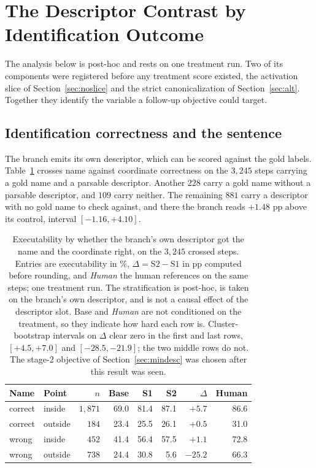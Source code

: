 \documentclass[conference]{IEEEtran}
\begin{document}
\section{The Descriptor Contrast by Identification Outcome}
\label{sec:diag}

The analysis below is post-hoc and rests on one treatment run. Two of its components were
registered before any treatment score existed, the activation slice of
Section~\ref{sec:noslice} and the strict canonicalization of Section~\ref{sec:alt}. Together
they identify the variable a follow-up objective could target.

\subsection{Identification correctness and the sentence}
The branch emits its own descriptor, which can be scored against the gold labels.
Table~\ref{tab:cross} crosses name against coordinate correctness on the $3{,}245$ steps carrying a gold name and a parsable descriptor. Another $228$ carry a gold name
without a parsable descriptor, and $109$ carry neither. The remaining $881$ carry a descriptor
with no gold name to check against, and there the branch reads $+1.48$ pp above its control,
interval $[-1.16, +4.10]$.

\begin{table}[!t]
\caption{Executability by whether the branch's own descriptor got the name and the coordinate
right, on the $3{,}245$ crossed steps. Entries are executability in \%, $\Delta = \mathrm{S2} -
\mathrm{S1}$ in pp computed before rounding, and \emph{Human} the human references on the same
steps; one treatment run. The stratification is post-hoc, is taken on the branch's own
descriptor, and is not a causal effect of the descriptor slot. Base and \emph{Human} are not
conditioned on the treatment, so they indicate how hard each row is. Cluster-bootstrap intervals
on $\Delta$ clear zero in the first and last rows, $[+4.5, +7.0]$ and $[-28.5, -21.9]$; the two
middle rows do not. The stage-2 objective of Section~\ref{sec:mindesc} was chosen after this
result was seen.}
\label{tab:cross}
\centering
\footnotesize
\setlength{\tabcolsep}{4pt}
\begin{tabular}{llrrrrrr}
\toprule
Name & Point & $n$ & Base & S1 & S2 & $\Delta$ & Human \\
\midrule
correct & inside  & $1{,}871$ & 69.0 & 81.4 & 87.1 & $+5.7$ & 86.6 \\
correct & outside & $184$     & 23.4 & 25.5 & 26.1 & $+0.5$ & 31.0 \\
wrong   & inside  & $452$     & 41.4 & 56.4 & 57.5 & $+1.1$ & 72.8 \\
wrong   & outside & $738$     & 24.4 & 30.8 & 5.6  & $-25.2$ & 66.3 \\
\bottomrule
\end{tabular}
\end{table}
\end{document}
